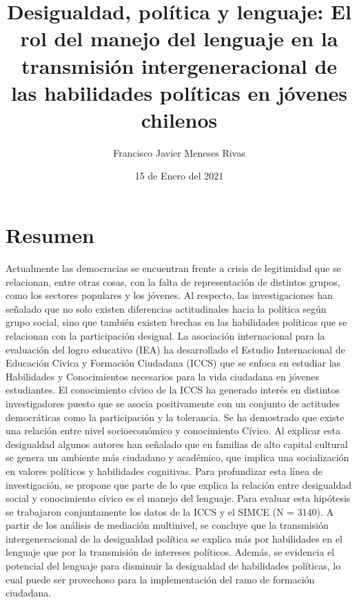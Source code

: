 \documentclass[12pt,twoside]{templates/facsothesis}
\title{Desigualdad, política y lenguaje: El rol del manejo del lenguaje en la transmisión intergeneracional de las habilidades políticas en jóvenes chilenos}
\author{Francisco Javier Meneses Rivas}
\date{15 de Enero del 2021}
\begin{document}

  \maketitle

\frontmatter %
\pagestyle{empty} %



  \setcounter{tocdepth}{1}
  \setlength{\parskip}{0pt}
  \tableofcontents

\setlength\parskip{1em plus 0.1em minus 0.2em}

  \listoftables

  \listoffigures



\mainmatter %
\pagestyle{fancyplain} %

\hypertarget{resumen}{%
\chapter*{Resumen}\label{resumen}}

Actualmente las democracias se encuentran frente a crisis de legitimidad que se relacionan, entre otras cosas, con la falta de representación de distintos grupos, como los sectores populares y los jóvenes. Al respecto, las investigaciones han señalado que no solo existen diferencias actitudinales hacia la política según grupo social, sino que también existen brechas en las habilidades políticas que se relacionan con la participación desigual. La asociación internacional para la evaluación del logro educativo (IEA) ha desarrollado el Estudio Internacional de Educación Cívica y Formación Ciudadana (ICCS) que se enfoca en estudiar las Habilidades y Conocimientos necesarios para la vida ciudadana en jóvenes estudiantes. El conocimiento cívico de la ICCS ha generado interés en distintos investigadores puesto que se asocia positivamente con un conjunto de actitudes democráticas como la participación y la tolerancia. Se ha demostrado que existe una relación entre nivel socioeconómico y conocimiento Cívico. Al explicar esta desigualdad algunos autores han señalado que en familias de alto capital cultural se genera un ambiente más ciudadano y académico, que implica una socialización en valores políticos y habilidades cognitivas. Para profundizar esta línea de investigación, se propone que parte de lo que explica la relación entre desigualdad social y conocimiento cívico es el manejo del lenguaje. Para evaluar esta hipótesis se trabajaron conjuntamente los datos de la ICCS y el SIMCE (N = 3140). A partir de los análisis de mediación multinivel, se concluye que la transmisión intergeneracional de la desigualdad política se explica más por habilidades en el lenguaje que por la transmisión de intereses políticos. Además, se evidencia el potencial del lenguaje para disminuir la desigualdad de habilidades políticas, lo cual puede ser provechoso para la implementación del ramo de formación ciudadana.
\end{document}
